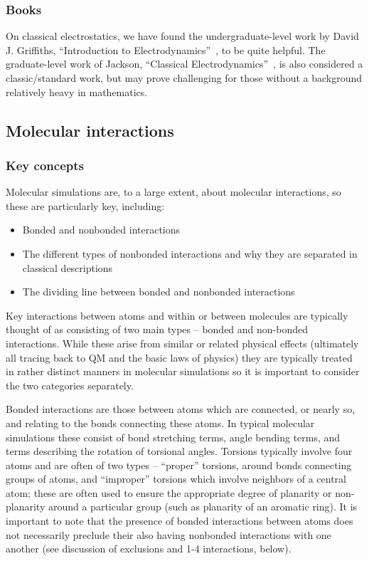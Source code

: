 \documentclass[9pt,bestpractices]{livecoms}
\begin{document}
\subsubsection{Books}

On classical electrostatics, we have found the undergraduate-level work by David J. Griffiths, ``Introduction to Electrodynamics''~\cite{Griffiths:2017:}, to be quite helpful.
The graduate-level work of Jackson, ``Classical Electrodynamics''~\cite{Jackson:1998:}, is also considered a classic/standard work, but may prove challenging for those without a background relatively heavy in mathematics.


\subsection{Molecular interactions}
\label{sec:mol_interactions}
\subsubsection{Key concepts}
Molecular simulations are, to a large extent, about molecular interactions, so these are particularly key, including:
\begin{itemize}
\item Bonded and nonbonded interactions
\item The different types of nonbonded interactions and why they are separated in classical descriptions
\item The dividing line between bonded and nonbonded interactions
\end{itemize}

Key interactions between atoms and within or between molecules are typically thought of as consisting of two main types -- bonded and non-bonded interactions. 
While these arise from similar or related physical effects (ultimately all tracing back to QM and the basic laws of physics) they are typically treated in rather distinct manners in molecular simulations so it is important to consider the two categories
separately.

Bonded interactions are those between atoms which are connected, or nearly so, and relating to the bonds connecting these atoms. 
In typical molecular simulations these consist of bond stretching terms, angle bending terms, and terms describing the rotation of torsional angles. 
Torsions typically involve four atoms and are often of two types -- ``proper'' torsions, around bonds connecting groups of atoms, and ``improper''
torsions which involve neighbors of a central atom; these are often used to ensure the appropriate degree of planarity or non-planarity around a particular group (such as planarity of an aromatic ring). 
It is important to note that the presence of bonded interactions between atoms does not necessarily preclude their also having nonbonded interactions with one another (see discussion of exclusions and 1-4 interactions, below).
\end{document}
